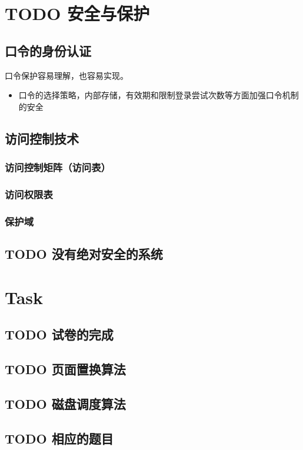 \documentclass[11pt]{article}
\begin{document}
\section{{\bfseries\sffamily TODO} 安全与保护}
\label{sec-6}
\subsection{口令的身份认证}
\label{sec-6-1}
口令保护容易理解，也容易实现。
\begin{itemize}
\item 口令的选择策略，内部存储，有效期和限制登录尝试次数等方面加强口令机制的安全
\end{itemize}
\subsection{访问控制技术}
\label{sec-6-2}
\subsubsection{访问控制矩阵（访问表）}
\label{sec-6-2-1}
\subsubsection{访问权限表}
\label{sec-6-2-2}
\subsubsection{保护域}
\label{sec-6-2-3}
\subsection{{\bfseries\sffamily TODO} 没有绝对安全的系统}
\label{sec-6-3}
\section{Task}
\label{sec-7}
\subsection{{\bfseries\sffamily TODO} 试卷的完成}
\label{sec-7-1}
\subsection{{\bfseries\sffamily TODO} 页面置换算法}
\label{sec-7-2}
\subsection{{\bfseries\sffamily TODO} 磁盘调度算法}
\label{sec-7-3}
\subsection{{\bfseries\sffamily TODO} 相应的题目}
\label{sec-7-4}
\end{document}
